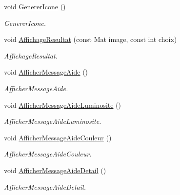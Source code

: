 \begin{DoxyCompactItemize}
\mbox{\label{classMainWindow_ac7607afeed0426a455c2cb4832ce9e80}} 
void \hyperlink{classMainWindow_ac7607afeed0426a455c2cb4832ce9e80}{Generer\+Icone} ()
\begin{DoxyCompactList}\small\item\em Generer\+Icone. \end{DoxyCompactList}\item 
void \hyperlink{classMainWindow_a6a5fc1b965e50e296003a94a73fea202}{Affichage\+Resultat} (const Mat image, const int choix)
\begin{DoxyCompactList}\small\item\em Affichage\+Resultat. \end{DoxyCompactList}\item 
\mbox{\label{classMainWindow_af468eb0ea0e800a7c54c13da1cafc1e6}} 
void \hyperlink{classMainWindow_af468eb0ea0e800a7c54c13da1cafc1e6}{Afficher\+Message\+Aide} ()
\begin{DoxyCompactList}\small\item\em Afficher\+Message\+Aide. \end{DoxyCompactList}\item 
\mbox{\label{classMainWindow_a6845f6f23cac943966de6cd177263607}} 
void \hyperlink{classMainWindow_a6845f6f23cac943966de6cd177263607}{Afficher\+Message\+Aide\+Luminosite} ()
\begin{DoxyCompactList}\small\item\em Afficher\+Message\+Aide\+Luminosite. \end{DoxyCompactList}\item 
\mbox{\label{classMainWindow_a7ff4fa7f02281f49507bc54e980fe759}} 
void \hyperlink{classMainWindow_a7ff4fa7f02281f49507bc54e980fe759}{Afficher\+Message\+Aide\+Couleur} ()
\begin{DoxyCompactList}\small\item\em Afficher\+Message\+Aide\+Couleur. \end{DoxyCompactList}\item 
\mbox{\label{classMainWindow_a3ead1323a922267903ef930220741242}} 
void \hyperlink{classMainWindow_a3ead1323a922267903ef930220741242}{Afficher\+Message\+Aide\+Detail} ()
\begin{DoxyCompactList}\small\item\em Afficher\+Message\+Aide\+Detail. \end{DoxyCompactList}\item 

\end{DoxyCompactItemize}
